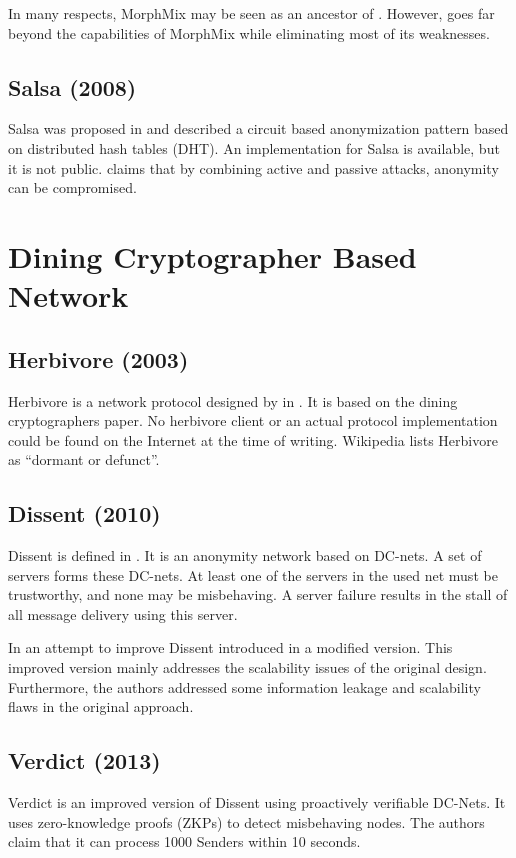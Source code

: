 In many respects, MorphMix may be seen as an ancestor of \MessageVortex. However, \MessageVortex{} goes far beyond the capabilities of MorphMix while eliminating most of its weaknesses.


\subsection{Salsa (2008)}
Salsa was proposed in \cite{Salsa} and described a circuit based anonymization pattern based on distributed hash tables (DHT). An implementation for Salsa is available, but it is not public. \cite{ccs2008:mittal} claims that by combining active and passive attacks, anonymity can be compromised.

\section{Dining Cryptographer Based Network}
\subsection{Herbivore (2003)}
Herbivore is a network protocol designed by \citeauthor{herbivore:tr} in \cite{herbivore:tr}. It is based on the dining cryptographers paper\cite{chaum-dc}. No herbivore client or an actual protocol implementation could be found on the Internet at the time of writing. Wikipedia lists Herbivore as ``dormant or defunct''.

\subsection{Dissent (2010)}
Dissent is defined in \cite{Corrigan-Gibbs:2010:DAA:1866307.1866346}. It is an anonymity network based on DC-nets. A set of servers forms these DC-nets. At least one of the servers in the used net must be trustworthy, and none may be misbehaving. A server failure results in the stall of all message delivery using this server.

In an attempt to improve Dissent \citeauthor{wolinsky2012dissent} introduced in \cite{wolinsky2012dissent} a modified version. This improved version mainly addresses the scalability issues of the original design. Furthermore, the authors addressed some information leakage and scalability flaws in the original approach.

\subsection{Verdict (2013)}
Verdict\cite{180367} is an improved version of Dissent using proactively verifiable DC-Nets. It uses zero-knowledge proofs (ZKPs) to detect misbehaving nodes. The authors claim that it can process 1000 Senders within 10 seconds.

